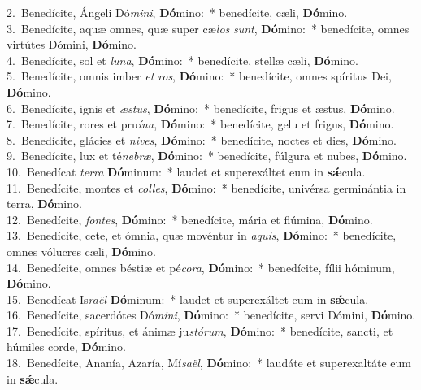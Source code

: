 {2.~}Benedícite, Ángeli Dó\textit{mi}\textit{ni}, \textbf{Dó}mino:~* benedícite, cæli, \textbf{Dó}mino.\\
{3.~}Benedícite, aquæ omnes, quæ super cæ\textit{los} \textit{sunt}, \textbf{Dó}mino:~* benedícite, omnes virtútes Dómini, \textbf{Dó}mino.\\
{4.~}Benedícite, sol et \textit{lu}\textit{na}, \textbf{Dó}mino:~* benedícite, stellæ cæli, \textbf{Dó}mino.\\
{5.~}Benedícite, omnis imber \textit{et} \textit{ros}, \textbf{Dó}mino:~* benedícite, omnes spíritus Dei, \textbf{Dó}mino.\\
{6.~}Benedícite, ignis et \textit{æ}\textit{stus}, \textbf{Dó}mino:~* benedícite, frigus et æstus, \textbf{Dó}mino.\\
{7.~}Benedícite, rores et pru\textit{í}\textit{na}, \textbf{Dó}mino:~* benedícite, gelu et frigus, \textbf{Dó}mino.\\
{8.~}Benedícite, glácies et \textit{ni}\textit{ves}, \textbf{Dó}mino:~* benedícite, noctes et dies, \textbf{Dó}mino.\\
{9.~}Benedícite, lux et té\textit{ne}\textit{bræ}, \textbf{Dó}mino:~* benedícite, fúlgura et nubes, \textbf{Dó}mino.\\
{10.~}Benedícat \textit{ter}\textit{ra} \textbf{Dó}minum:~* laudet et superexáltet eum in \textbf{sǽ}cula.\\
{11.~}Benedícite, montes et \textit{col}\textit{les}, \textbf{Dó}mino:~* benedícite, univérsa germinántia in terra, \textbf{Dó}mino.\\
{12.~}Benedícite, \textit{fon}\textit{tes}, \textbf{Dó}mino:~* benedícite, mária et flúmina, \textbf{Dó}mino.\\
{13.~}Benedícite, cete, et ómnia, quæ movéntur in \textit{a}\textit{quis}, \textbf{Dó}mino:~* benedícite, omnes vólucres cæli, \textbf{Dó}mino.\\
{14.~}Benedícite, omnes béstiæ et pé\textit{co}\textit{ra}, \textbf{Dó}mino:~* benedícite, fílii hóminum, \textbf{Dó}mino.\\
{15.~}Benedícat Is\textit{ra}\textit{ël} \textbf{Dó}minum:~* laudet et superexáltet eum in \textbf{sǽ}cula.\\
{16.~}Benedícite, sacerdótes Dó\textit{mi}\textit{ni}, \textbf{Dó}mino:~* benedícite, servi Dómini, \textbf{Dó}mino.\\
{17.~}Benedícite, spíritus, et ánimæ ju\textit{stó}\textit{rum}, \textbf{Dó}mino:~* benedícite, sancti, et húmiles corde, \textbf{Dó}mino.\\
{18.~}Benedícite, Ananía, Azaría, Mí\textit{sa}\textit{ël}, \textbf{Dó}mino:~* laudáte et superexaltáte eum in \textbf{sǽ}cula.\\
